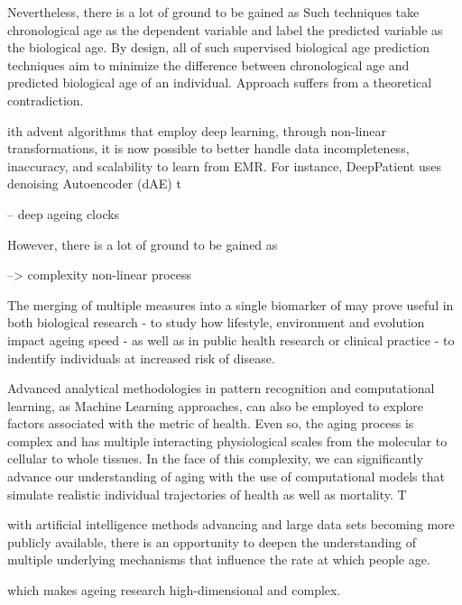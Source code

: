 Nevertheless, there is a lot of ground to be gained as 
Such techniques take chronological age as the dependent variable and label the predicted variable as the biological age. By design, all of such supervised biological age prediction techniques aim to minimize the difference between chronological age and predicted biological age of an individual. Approach suffers from a theoretical contradiction. 



ith advent algorithms that employ deep learning, through non-linear transformations, it is now possible to better handle data incompleteness, inaccuracy, and scalability to learn from EMR. For instance, DeepPatient uses denoising Autoencoder (dAE) t

-- deep ageing clocks

However, there is a lot of ground to be gained as 

--> complexity non-linear process

The merging of multiple measures into a single biomarker of may prove useful in both biological research - to study how lifestyle, environment and evolution impact ageing speed - as well as in public health research or clinical practice - to indentify individuals at increased risk of disease. 

Advanced analytical methodologies in pattern recognition and computational learning, as Machine Learning approaches, can also be employed to explore factors associated with the metric of health.
Even so, the aging process is complex and has multiple interacting physiological scales from the molecular to cellular to whole tissues. In the face of this complexity, we can significantly advance our understanding of aging with the use of computational models that simulate realistic individual trajectories of health as well as mortality. T





with artificial intelligence methods advancing and large data sets becoming more publicly available, there is an opportunity to deepen the understanding of multiple underlying mechanisms that influence the rate at which people age. 





which makes ageing research high-dimensional and complex. 